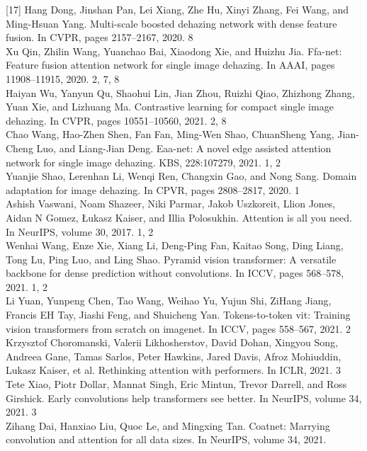 \documentclass{article}
\begin{document}
[17] Hang Dong, Jinshan Pan, Lei Xiang, Zhe Hu, Xinyi Zhang, Fei Wang, and Ming-Hsuan Yang. Multi-scale boosted dehazing network with dense feature fusion. In CVPR, pages 2157–2167, 2020. 8\\
[18] Xu Qin, Zhilin Wang, Yuanchao Bai, Xiaodong Xie, and Huizhu Jia. Ffa-net: Feature fusion attention network for single image dehazing. In AAAI, pages 11908–11915, 2020. 2, 7, 8\\
[19] Haiyan Wu, Yanyun Qu, Shaohui Lin, Jian Zhou, Ruizhi Qiao, Zhizhong Zhang, Yuan Xie, and Lizhuang Ma. Contrastive learning for compact single image dehazing. In CVPR, pages 10551–10560, 2021. 2, 8\\
[20] Chao Wang, Hao-Zhen Shen, Fan Fan, Ming-Wen Shao, ChuanSheng Yang, Jian-Cheng Luo, and Liang-Jian Deng. Eaa-net: A novel edge assisted attention network for single image dehazing. KBS, 228:107279, 2021. 1, 2\\
[21] Yuanjie Shao, Lerenhan Li, Wenqi Ren, Changxin Gao, and Nong Sang. Domain adaptation for image dehazing. In CPVR, pages 2808–2817, 2020. 1\\
[22] Ashish Vaswani, Noam Shazeer, Niki Parmar, Jakob Uszkoreit, Llion Jones, Aidan N Gomez, Łukasz Kaiser, and Illia Polosukhin. Attention is all you need. In NeurIPS, volume 30, 2017. 1, 2\\
[23] Wenhai Wang, Enze Xie, Xiang Li, Deng-Ping Fan, Kaitao Song, Ding Liang, Tong Lu, Ping Luo, and Ling Shao. Pyramid vision transformer: A versatile backbone for dense prediction without convolutions. In ICCV, pages 568–578, 2021. 1, 2\\
[24] Li Yuan, Yunpeng Chen, Tao Wang, Weihao Yu, Yujun Shi, ZiHang Jiang, Francis EH Tay, Jiashi Feng, and Shuicheng Yan. Tokens-to-token vit: Training vision transformers from scratch on imagenet. In ICCV, pages 558–567, 2021. 2\\
[25] Krzysztof Choromanski, Valerii Likhosherstov, David Dohan, Xingyou Song, Andreea Gane, Tamas Sarlos, Peter Hawkins, Jared Davis, Afroz Mohiuddin, Lukasz Kaiser, et al. Rethinking attention with performers. In ICLR, 2021. 3\\
[26] Tete Xiao, Piotr Dollar, Mannat Singh, Eric Mintun, Trevor Darrell, and Ross Girshick. Early convolutions help transformers see better. In NeurIPS, volume 34, 2021. 3\\
[27] Zihang Dai, Hanxiao Liu, Quoc Le, and Mingxing Tan. Coatnet: Marrying convolution and attention for all data sizes. In NeurIPS, volume 34, 2021.\\
\end{document}
